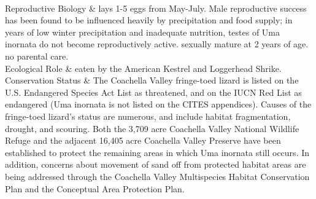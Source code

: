 \begin{center}
\begin{longtabu}
	\\
	\hline
	Reproductive Biology & 
	lays 1-5 eggs from May-July. Male reproductive success has been found to be influenced heavily by precipitation and food supply; in years of low winter precipitation and inadequate nutrition, testes of Uma inornata do not become reproductively active. sexually mature at 2 years of age. no parental care.
	\\
	\hline
	Ecological Role &
	eaten by the American Kestrel and Loggerhead Shrike.
	\\
	\hline
	Conservation Status & 
	The Coachella Valley fringe-toed lizard is listed on the U.S. Endangered Species Act List as threatened, and on the IUCN Red List as endangered (Uma inornata is not listed on the CITES appendices). Causes of the fringe-toed lizard's status are numerous, and include habitat fragmentation, drought, and scouring. Both the 3,709 acre Coachella Valley National Wildlife Refuge and the adjacent 16,405 acre Coachella Valley Preserve have been established to protect the remaining areas in which Uma inornata still occurs. In addition, concerns about movement of sand off from protected habitat areas are being addressed through the Coachella Valley Multispecies Habitat Conservation Plan and the Conceptual Area Protection Plan.
	\\
	\hline
\end{longtabu}
\end{center}